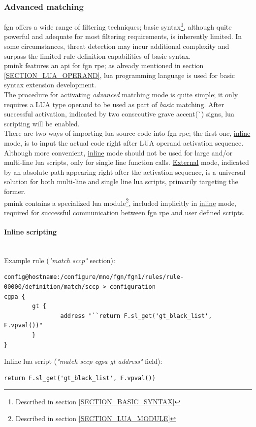 \documentclass[a4paper,latin]{paper}
\begin{document}
\subsubsection{Advanced matching}\label{SECTION_8_2_5} 
\acrfull{fgn} offers a wide range of filtering techniques; basic syntax\footnote{Described in section \ref{SECTION_BASIC_SYNTAX}}, although quite powerful and adequate 
for most filtering requirements, is inherently limited. In some circumstances, \gls{threat} detection may incur additional complexity and surpass the limited \gls{rule} definition
capabilities of basic syntax.\\

\acrfull{pmink} features an \acrfull{api} for \acrshort{fgn} \acrfull{rpe}; as already mentioned in section \ref{SECTION_LUA_OPERAND}, \Gls{lua} programming language is used
for basic syntax extension development.\\

The procedure for activating \textit{advanced} matching mode is quite simple; it only requires a LUA type operand to be used as part of \textit{basic} matching. After
successful activation, indicated by two consecutive grave accent(\`{}) signs, \Gls{lua} scripting will be enabled.\\

There are two ways of importing \Gls{lua} source code into \acrshort{fgn} \acrlong{rpe}; the first one, \underline{inline} mode, is to input the actual code right after LUA operand 
activation sequence. Although more convenient, \underline{inline} mode should not be used for large and/or multi-line \Gls{lua} scripts, only for single line function calls. 
\underline{External} mode, indicated by an absolute path appearing right after the activation sequence, is a universal solution for both multi-line and single line \Gls{lua} scripts, primarily
targeting the former.\\

\acrfull{pmink} contains a specialized \Gls{lua} module\footnote{Described in section \ref{SECTION_LUA_MODULE}}, included implicitly in \underline{inline} mode, required for successful 
communication between \acrshort{fgn} \acrlong{rpe} and user defined scripts. 

\paragraph{Inline scripting}
\mbox{}\\
\noindent{}Example rule (\textit{"match sccp"} section):
\begin{lstlisting}[style=BashInputStyle, belowskip=\baselineskip, upquote=true]
config@hostname:/configure/mno/fgn/fgn1/rules/rule-00000/definition/match/sccp > configuration 
cgpa {
        gt {
                address "``return F.sl_get('gt_black_list', F.vpval())"
        }                                   
}
\end{lstlisting}
\noindent{}Inline \Gls{lua} script (\textit{"match sccp cgpa gt address"} field):
\begin{lstlisting}[style=LuaInputStyle, belowskip=\baselineskip, upquote=true]
return F.sl_get('gt_black_list', F.vpval())
\end{lstlisting}
\clearpage
\end{document}
